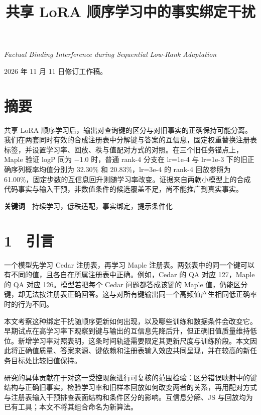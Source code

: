 \documentclass[UTF8,fontset=fandol,10pt,a4paper]{ctexart}
\author{}
\date{}
\makeatletter
\renewcommand{\maketitle}{\begin{center}{\LARGE\bfseries\@title\par}\end{center}\vspace{.4em}}
\makeatother
\begin{document}
\title{共享 LoRA 顺序学习中的事实绑定干扰}
\maketitle
\emph{Factual Binding Interference during Sequential Low-Rank Adaptation}



2026 年 11 月 11 日修订工作稿。



\section*{摘要}
共享 LoRA 顺序学习后，输出对查询键的区分与对旧事实的正确保持可能分离。我们在两套同时有效的合成注册表中分解键与答案的互信息，固定权重替换注册表标签，并设置学习率、回放、秩与值配对方式的对照。在三个旧任务锚点上，Maple 验证 logP 同为 −1.0 时，普通 rank-4 分支在 lr=1e-4 与 lr=1e-3 下的旧正确序列概率均值分别为 32.30\% 和 20.83\%，lr=3e-4 的 rank-4 回放参照为 61.00\%，固定步数的互信息回升则随学习率改变。证据来自两款小模型上的合成代码事实与输入干预，非数值条件的候选覆盖不足，尚不能推广到真实事实。



\textbf{关键词}　持续学习，低秩适配，事实绑定，提示条件化



\section*{1　引言}
一个模型先学习 Cedar 注册表，再学习 Maple 注册表。两张表中的同一个键可以有不同的值，且各自在所属注册表中正确。例如，Cedar 的 QA 对应 127，Maple 的 QA 对应 126。模型若把每个 Cedar 问题都答成该键的 Maple 值，仍能区分键，却无法按注册表正确回答。这与对所有键输出同一个高频值产生相同低正确率时的行为不同。



本文考察这种绑定干扰随顺序更新如何出现，以及哪些训练和数据条件会改变它。早期试点在高学习率下观察到键与输出的互信息先降后升，但正确旧值质量维持低位。新增学习率对照表明，这条时间轨迹需要限定其更新尺度与训练阶段。本文因此将正确值质量、答案来源、键依赖和注册表输入效应共同呈现，并在较高的新任务目标处比较旧值保持。



研究的具体贡献在于对这一受控现象进行可复核的范围检验：区分错误映射中的键结构与正确旧事实，检验学习率和旧样本回放如何改变两者的关系，再用配对方式与注册表输入干预排查表面结构和条件区分的影响。互信息分解、JS 与回放均为已有工具；本文不将其组合命名为新算法。
\end{document}
